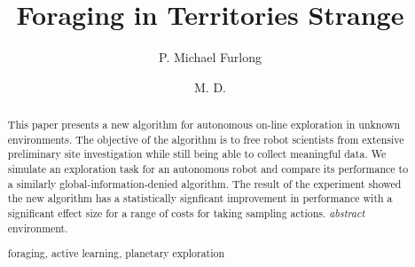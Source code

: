 \documentclass[runningheads,a4paper]{llncs}
\newcommand{\keywords}[1]{\par\addvspace\baselineskip
\noindent\keywordname\enspace\ignorespaces#1}
\begin{document}
\mainmatter  %

\title{Foraging in Territories Strange}


%
%
\author{P. Michael Furlong \and M. D. }
%


%
%

\maketitle


\begin{abstract}
This paper presents a new algorithm for autonomous on-line exploration in unknown environments.  The objective of the algorithm is to free robot scientists from extensive preliminary site investigation while still being able to collect meaningful data.  We simulate an exploration task for an autonomous robot and compare its performance to a similarly global-information-denied algorithm.  The result of the experiment showed the new algorithm has a statistically signficant improvement in performance with a significant effect size for a range of costs for taking sampling actions.
\emph{abstract} environment.
\keywords{foraging, active learning, planetary exploration}
\end{abstract}










\appendix
\end{document}
